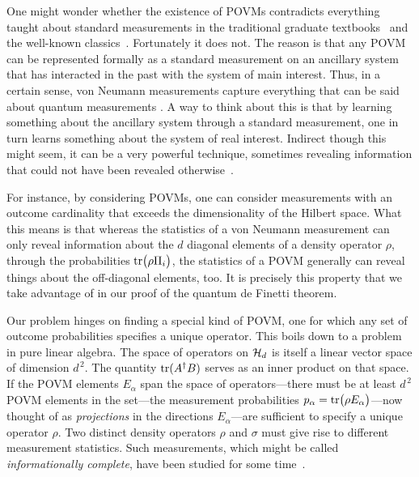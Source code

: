 \documentclass[12pt,aps,eqsecnum]{revtex4-1}
\begin{document}
One might wonder whether the existence of POVMs contradicts
everything taught about standard measurements in the traditional
graduate textbooks~\cite{QuantumClassics1} and the well-known
classics~\cite{QuantumClassics2}. Fortunately it does not. The
reason is that any POVM can be represented formally as a standard
measurement on an ancillary system that has interacted in the past
with the system of main interest.  Thus, in a certain sense, von
Neumann measurements capture everything that can be said about
quantum measurements \cite{Kraus1983}. A way to think about this
is that by learning something about the ancillary system through a
standard measurement, one in turn learns something about the
system of real interest. Indirect though this might seem, it can
be a very powerful technique, sometimes revealing information that
could not have been revealed otherwise~\cite{Holevo1973}.

For instance, by considering POVMs, one can consider measurements
with an outcome cardinality that exceeds the dimensionality of the
Hilbert space. What this means is that whereas the statistics of a
von Neumann measurement can only reveal information about the $d$
diagonal elements of a density operator $\rho$, through the
probabilities ${\rm tr}\big(\rho\Pi_i\big)$, the statistics of a
POVM generally can reveal things about the off-diagonal elements,
too. It is precisely this property that we take advantage of in our
proof of the quantum de Finetti theorem.

Our problem hinges on finding a special kind of POVM, one for
which any set of outcome probabilities specifies a unique
operator.  This boils down to a problem in pure linear algebra.
The space of operators on ${\cal H}_d$ is itself a linear vector
space of dimension $d^{\,2}$. The quantity ${\rm tr}(A^\dagger B)$
serves as an inner product on that space. If the POVM elements
$E_\alpha$ span the space of operators---there must be at least
$d^{\,2}$ POVM elements in the set---the measurement probabilities
$p_\alpha={\rm tr}\big(\rho E_\alpha\big)$---now thought of as
{\it projections\/} in the directions $E_\alpha$---are sufficient
to specify a unique operator $\rho$.  Two distinct density
operators $\rho$ and $\sigma$ must give rise to different
measurement statistics. Such measurements, which might be called
{\it informationally complete}, have been studied for some
time~\cite{Prugovecki1977}.
\end{document}
